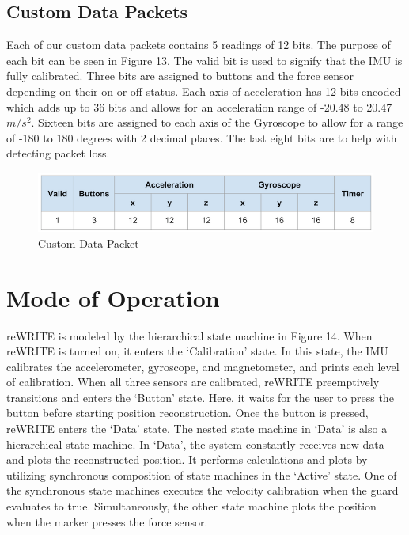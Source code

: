 \documentclass[12pt,journal]{IEEEtran}
\begin{document}
\subsection{Custom Data Packets}
Each of our custom data packets contains 5 readings of 12 bits. The purpose of each bit can be seen in Figure 13. The valid bit is used to signify that the IMU is fully calibrated. Three bits are assigned to buttons and the force sensor depending on their on or off status. Each axis of acceleration has 12 bits encoded which adds up to 36 bits and allows for an acceleration range of -20.48 to 20.47 $m/s^2$. Sixteen bits are assigned to each axis of the Gyroscope to allow for a range of -180 to 180 degrees with 2 decimal places. The last eight bits are to help with detecting packet loss.

\begin{figure}[h]
    \includegraphics[width=\linewidth]{figures/packet}
  		\caption{Custom Data Packet}
  	\label{fig:packet}
\end{figure}

\section{Mode of Operation}
reWRITE is modeled by the hierarchical state machine in Figure 14. When reWRITE is turned on, it enters the ‘Calibration’ state. In this state, the IMU calibrates the accelerometer, gyroscope, and magnetometer, and prints each level of calibration. When all three sensors are calibrated, reWRITE preemptively transitions and enters the ‘Button’ state. Here, it waits for the user to press the button before starting position reconstruction. Once the button is pressed, reWRITE enters the ‘Data’ state. The nested state machine in ‘Data’ is also a hierarchical state machine. In ‘Data’, the system constantly receives new data and plots the reconstructed position. It performs calculations and plots by utilizing synchronous composition of state machines in the ‘Active’ state. One of the synchronous state machines executes the velocity calibration when the guard evaluates to true. Simultaneously, the other state machine plots the position when the marker presses the force sensor.
\end{document}
